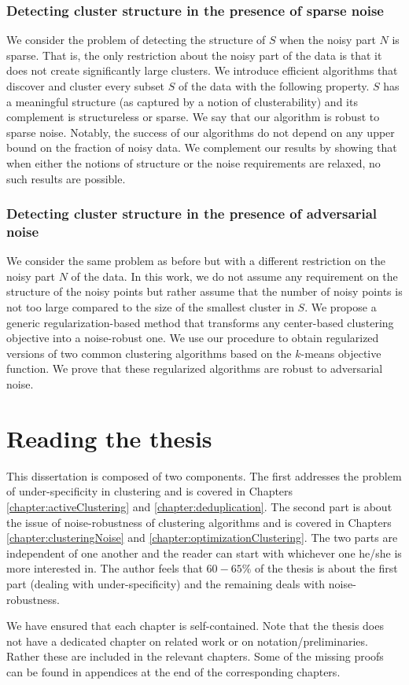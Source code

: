 \documentclass[12pt]{article}
\begin{document}
\subsubsection*{Detecting cluster structure in the presence of sparse noise}
We consider the problem of detecting the structure of $S$ when the noisy part $N$ is sparse. That is, the only restriction about the noisy part of the data is that it does not create significantly large clusters. We introduce efficient algorithms that discover and cluster every subset $S$ of the data with the following property. $S$ has a meaningful structure (as captured by a notion of clusterability) and its complement is structureless or sparse. We say that our algorithm is robust to sparse noise. Notably, the success of our algorithms do not depend on any upper bound on the fraction of noisy data. We complement our results by showing that when either the notions of structure or the noise requirements are relaxed, no such results are possible.

\subsubsection*{Detecting cluster structure in the presence of adversarial noise}
We consider the same problem as before but with a different restriction on the noisy part $N$ of the data. In this work, we do not assume any requirement on the structure of the noisy points but rather assume that the number of noisy points is not too large compared to the size of the smallest cluster in $S$. We propose a generic regularization-based method that transforms any center-based clustering objective into a noise-robust one. We use our procedure to obtain regularized versions of two common clustering algorithms based on the $k$-means objective function. We prove that these regularized algorithms are robust to adversarial noise. 

\section{Reading the thesis}
This dissertation is composed of two components. The first addresses the problem of under-specificity in clustering and is covered in Chapters \ref{chapter:activeClustering} and \ref{chapter:deduplication}. The second part is about the issue of noise-robustness of clustering algorithms and is covered in Chapters \ref{chapter:clusteringNoise} and \ref{chapter:optimizationClustering}. The two parts are independent of one another and the reader can start with whichever one he/she is more interested in. The author feels that $60-65\%$ of the thesis is about the first part (dealing with under-specificity) and the remaining deals with noise-robustness. 

We have ensured that each chapter is self-contained. Note that the thesis does not have a dedicated chapter on related work or on notation/preliminaries. Rather these are included in the relevant chapters. Some of the missing proofs can be found in appendices at the end of the corresponding chapters.
  
\ifdefined\COMPLETE
\else
\end{document}
